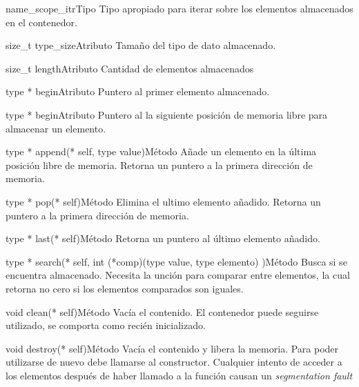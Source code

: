 \begin{apientry}{name\_scope\_itr}{Tipo}
    Tipo apropiado para iterar sobre los elementos almacenados en el contenedor. 
\end{apientry}

\begin{apientry}{size\_t type\_size}{Atributo}
    Tamaño del tipo de dato almacenado.    
\end{apientry}

\begin{apientry}{size\_t length}{Atributo}
    Cantidad de elementos almacenados
\end{apientry}

\begin{apientry}{type * begin}{Atributo}
    Puntero al primer elemento almacenado.
\end{apientry}

\begin{apientry}{type * begin}{Atributo}
    Puntero al la siguiente posición de memoria libre para almacenar un elemento.
\end{apientry}

\begin{apientry}{type * append(* self, type value)}{Método}
    Añade un elemento en la última posición libre de memoria. Retorna un puntero a la primera dirección de memoria. 
\end{apientry}

\begin{apientry}{type * pop(* self)}{Método}
    Elimina el ultimo elemento añadido. Retorna un puntero a la primera dirección de memoria.
\end{apientry}

\begin{apientry}{type * last(* self)}{Método}
    Retorna un puntero al último elemento añadido. 
\end{apientry}

\begin{apientry}{type * search(* self, int (*comp)(type value, type elemento) )}{Método}
    Busca si  se encuentra almacenado. Necesita la unción  para comparar entre elementos, la cual retorna no cero si los elementos comparados son iguales.  
\end{apientry}

\begin{apientry}{void clean(* self)}{Método}
    Vacía el contenido. El contenedor puede seguirse utilizado, se comporta como recién inicializado. 
\end{apientry}

\begin{apientry}{void destroy(* self)}{Método}
    Vacía el contenido y libera la memoria. Para poder utilizarse de nuevo debe llamarse al constructor. Cualquier intento de acceder a los elementos después de haber llamado a la función causan un \emph{segmentation fault}
\end{apientry}





